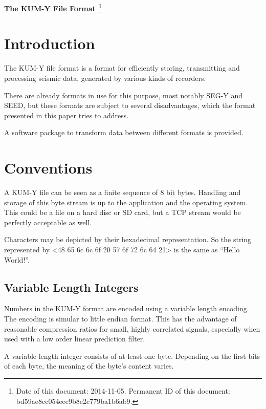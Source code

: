 \documentclass[DIV=10]{scrartcl}
\begin{document}
\strut

\vspace{1cm}

\centerline{\huge \textbf{The KUM-Y File Format%
\footnote{\raggedright Date of this document: 2014-11-05.
Permanent ID of this document: bd59ae8cc054eee9b8e2c779ba1b6ab9.}}}

\vspace{1cm}

\section{Introduction}

The KUM-Y file format is a format for efficiently storing, transmitting and processing seismic data, generated by various kinds of recorders.

There are already formats in use for this purpose, most notably SEG-Y and SEED, but these formats are subject to several disadvantages, which the format presented in this paper tries to address.

A software package to transform data between different formats is provided.

\section{Conventions}

A KUM-Y file can be seen as a finite sequence of 8 bit bytes.
Handling and storage of this byte stream is up to the application and the operating system.
This could be a file on a hard disc or SD card, but a TCP stream would be perfectly acceptable as well.

Characters may be depicted by their hexadecimal representation.
So the string represented by <48 65 6c 6c 6f 20 57 6f 72 6c 64 21> is the same as “Hello World!”.

\subsection{Variable Length Integers}
\label{varint}

Numbers in the KUM-Y format are encoded using a variable length encoding. The encoding is simular to little endian format.
This has the advantage of reasonable compression ratios for small, highly correlated signals, especially when used with a low order linear prediction filter.

A variable length integer consists of at least one byte.
Depending on the first bits of each byte, the meaning of the byte’s content varies.
\end{document}
